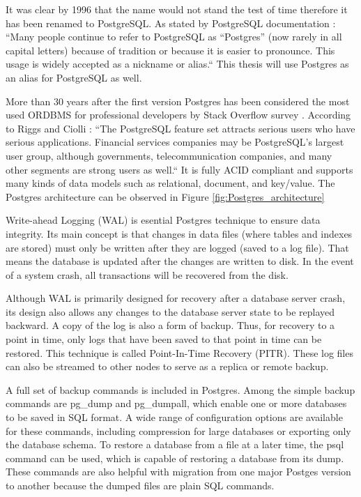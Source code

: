 It was clear by 1996 that the name would not stand the test of time therefore it has been renamed to PostgreSQL. As stated by PostgreSQL documentation \cite{docuPgBriefHistory}: “Many people continue to refer to PostgreSQL as “Postgres” (now rarely in all capital letters) because of tradition or because it is easier to pronounce. This usage is widely accepted as a nickname or alias.“ This thesis will use Postgres as an alias for PostgreSQL as well.

More than 30 years after the first version Postgres has been considered the most used ORDBMS for professional developers by Stack Overflow survey \cite{so2022survey}. According to Riggs and Ciolli \cite{pg14introduction}: “The PostgreSQL feature set attracts serious users who have serious applications. Financial services companies may be PostgreSQL's largest user group, although governments, telecommunication companies, and many other segments are strong users as well.“ It is fully ACID compliant \cite{juba2015learningTransactionIsolation}
and supports many kinds of data models such as relational, document, and key/value. \cite{pg14introduction} The Postgres architecture can be observed in Figure \ref{fig:Postgres_architecture}



Write-ahead Logging (WAL) is esential Postgres technique to ensure data integrity. Its main concept is that changes in data files (where tables and indexes are stored) must only be written after they are logged (saved to a log file). That means the database is updated after the changes are written to disk. In the event of a system crash, all transactions will be recovered from the disk. \cite{docuPgWal}

Although WAL is primarily designed for recovery after a database server crash, its design also allows any changes to the database server state to be replayed backward. A copy of the log is also a form of backup. Thus, for recovery to a point in time, only logs that have been saved to that point in time can be restored. This technique is called Point-In-Time Recovery (PITR). \cite{DocuPgPITR} These log files can also be streamed to other nodes to serve as a replica or remote backup. \cite{pg14replication}

A full set of backup commands is included in Postgres. Among the simple backup commands are pg\_dump and pg\_dumpall, which enable one or more databases to be saved in SQL format. A wide range of configuration options are available for these commands, including compression for large databases or exporting only the database schema. To restore a database from a file at a later time, the psql command can be used, which is capable of restoring a database from its dump. \cite{DocuPgDump} These commands are also helpful with migration from one major Postges version to another because the dumped files are plain SQL commands.

